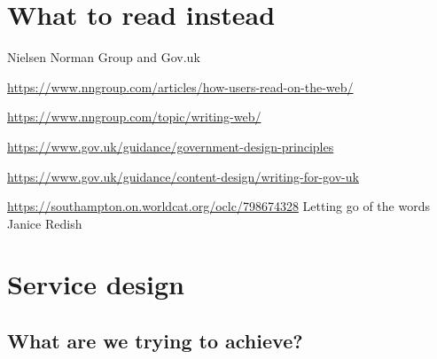 \documentclass[
  letterpaper,
  DIV=11,
  numbers=noendperiod]{scrreprt}
\begin{document}

\hypertarget{what-to-read-instead}{%
\chapter{What to read instead}\label{what-to-read-instead}}

Nielsen Norman Group and Gov.uk

\url{https://www.nngroup.com/articles/how-users-read-on-the-web/}

\url{https://www.nngroup.com/topic/writing-web/}

\url{https://www.gov.uk/guidance/government-design-principles}

\url{https://www.gov.uk/guidance/content-design/writing-for-gov-uk}

\url{https://southampton.on.worldcat.org/oclc/798674328} Letting go of
the words Janice Redish


\hypertarget{service-design}{%
\chapter{Service design}\label{service-design}}

\hypertarget{what-are-we-trying-to-achieve}{%
\section{What are we trying to
achieve?}\label{what-are-we-trying-to-achieve}}
\end{document}
